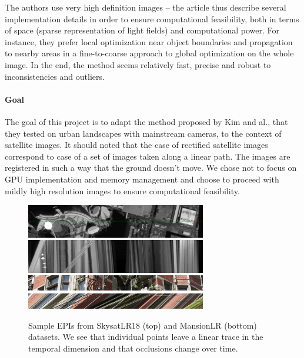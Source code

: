 \documentclass{article}
\def\epiWidth{0.7}
\theoremstyle{definition}
\begin{document}
The authors use very high definition images -- the article thus describe several implementation details in order to ensure computational feasibility, both in terms of space (sparse representation of light fields) and computational power. For instance, they prefer local optimization near object boundaries and propagation to nearby areas in a fine-to-coarse approach to global optimization on the whole image. In the end, the method seems relatively fast, precise and robust to inconsistencies and outliers.


\paragraph{Goal} The goal of this project is to adapt the method proposed by Kim and al., that they tested on urban landscapes with mainstream cameras, to the context of satellite images. It should noted that the case of rectified satellite images correspond to case of a set of images taken along a linear path. The images are registered in such a way that the ground doesn’t move. We chose not to focus on GPU implementation and memory management and choose to proceed with mildly high resolution images to ensure computational feasibility.


\begin{figure}[t]
  \centering
  \includegraphics[width=\epiWidth\textwidth]{images/1519991772641_1st.png}\\
  \includegraphics[width=\epiWidth\textwidth]{images/1519991772641_epi.png}\\[0.5cm]
  \includegraphics[width=\epiWidth\textwidth]{images/1521725699383_1st.png}\\
  \includegraphics[width=\epiWidth\textwidth]{images/1521725699383_epi.png}
  \caption{Sample EPIs from SkysatLR18 (top) and MansionLR (bottom) datasets. We see that individual points leave a linear trace in the temporal dimension and that occlusions change over time.}
  \label{fig:exepi}
\end{figure}
\end{document}
